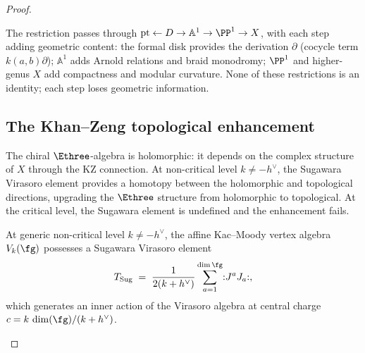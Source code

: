 \begin{proof}
\begin{remark}
\label{rem:disk-vs-point}
The restriction passes through
$\mathrm{pt} \leftarrow D \to \mathbb{A}^1 \to \PP^1
\to X$, with each step adding geometric content: the formal
disk provides the derivation $\partial$ (cocycle term
$k(a,b)\partial$); $\mathbb{A}^1$ adds Arnold relations
and braid monodromy; $\PP^1$ and higher-genus $X$ add
compactness and modular curvature. None of these
restrictions is an identity; each step loses geometric
information.
\end{remark}


\subsection{The Khan--Zeng topological enhancement}
\label{subsec:khan-zeng-enhancement}

The chiral $\Ethree$-algebra is holomorphic: it depends on the
complex structure of $X$ through the KZ connection. At
non-critical level $k \neq -h^\vee$, the Sugawara Virasoro
element provides a homotopy between the holomorphic and
topological directions, upgrading the $\Ethree$ structure
from holomorphic to topological. At the critical level,
the Sugawara element is undefined and the enhancement fails.

\begin{proposition}
\label{prop:khan-zeng-topological}
At generic non-critical level $k \neq -h^\vee$, the affine
Kac--Moody vertex algebra $V_k(\fg)$ possesses a Sugawara
Virasoro element
\begin{equation}\label{eq:sugawara-element}
  T_{\mathrm{Sug}} \;=\;
  \frac{1}{2(k + h^\vee)}
  \sum_{a=1}^{\dim \fg}
  \mathopen{:} J^a J_a \mathclose{:},
\end{equation}
which generates an inner action of the Virasoro algebra at
central charge $c = k\,\dim(\fg)/(k + h^\vee)$.


\end{proposition}
\end{proof}

